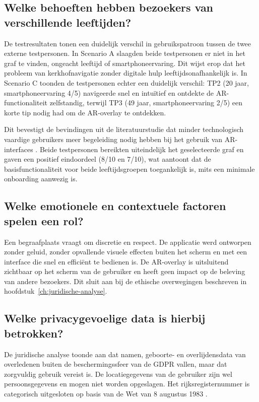 \subsection{Welke behoeften hebben bezoekers van verschillende leeftijden?}

De testresultaten tonen een duidelijk verschil in gebruikspatroon tussen de
twee externe testpersonen. In Scenario A slaagden beide testpersonen er niet
in het graf te vinden, ongeacht leeftijd of smartphoneervaring. Dit wijst erop
dat het probleem van kerkhofnavigatie zonder digitale hulp leeftijdsonafhankelijk
is. In Scenario C toonden de testpersonen echter een duidelijk verschil: TP2
(20 jaar, smartphoneervaring 4/5) navigeerde snel en intuïtief en ontdekte de
AR-functionaliteit zelfstandig, terwijl TP3 (49 jaar, smartphoneervaring 2/5)
een korte tip nodig had om de AR-overlay te ontdekken.

Dit bevestigt de bevindingen uit de literatuurstudie dat minder technologisch
vaardige gebruikers meer begeleiding nodig hebben bij het gebruik van AR-interfaces
\autocite{Haekkilae2022}. Beide testpersonen bereikten uiteindelijk het geselecteerde
graf en gaven een positief eindoordeel (8/10 en 7/10), wat aantoont dat de
basisfunctionaliteit voor beide leeftijdsgroepen toegankelijk is, mits een
minimale onboarding aanwezig is.

\subsection{Welke emotionele en contextuele factoren spelen een rol?}

Een begraafplaats vraagt om discretie en respect. De applicatie werd ontworpen
zonder geluid, zonder opvallende visuele effecten buiten het scherm en met een
interface die snel en efficiënt te bedienen is. De AR-overlay is uitsluitend
zichtbaar op het scherm van de gebruiker en heeft geen impact op de beleving
van andere bezoekers. Dit sluit aan bij de ethische overwegingen beschreven
in hoofdstuk~\ref{ch:juridische-analyse}.

\subsection{Welke privacygevoelige data is hierbij betrokken?}

De juridische analyse toonde aan dat namen, geboorte- en overlijdensdata van
overledenen buiten de beschermingssfeer van de GDPR vallen, maar dat zorgvuldig
gebruik vereist is. De locatiegegevens van de gebruiker zijn wel persoonsgegevens
en mogen niet worden opgeslagen. Het rijksregisternummer is categorisch
uitgesloten op basis van de Wet van 8 augustus 1983 \autocite{WetRijksregister1983}.


